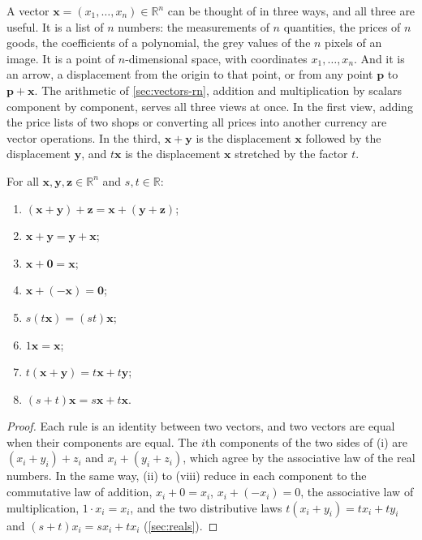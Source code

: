 A vector $\mathbf x=(x_1,\ldots,x_n)\in\mathbb R^n$ can be thought of in three ways, and all three are useful. It is a list of $n$ numbers: the measurements of $n$ quantities, the prices of $n$ goods, the coefficients of a polynomial, the grey values of the $n$ pixels of an image. It is a point of $n$-dimensional space, with coordinates $x_1,\ldots,x_n$. And it is an arrow, a displacement from the origin to that point, or from any point $\mathbf p$ to $\mathbf p+\mathbf x$. The arithmetic of \cref{sec:vectors-rn}, addition and multiplication by scalars component by component, serves all three views at once. In the first view, adding the price lists of two shops or converting all prices into another currency are vector operations. In the third, $\mathbf x+\mathbf y$ is the displacement $\mathbf x$ followed by the displacement $\mathbf y$, and $t\mathbf x$ is the displacement $\mathbf x$ stretched by the factor $t$.

\begin{proposition}
\label{prop:vector-rules}
For all $\mathbf x,\mathbf y,\mathbf z\in\mathbb R^n$ and $s,t\in\mathbb R$:
\begin{enumerate}
\item $(\mathbf x+\mathbf y)+\mathbf z=\mathbf x+(\mathbf y+\mathbf z)$;
\item $\mathbf x+\mathbf y=\mathbf y+\mathbf x$;
\item $\mathbf x+\mathbf 0=\mathbf x$;
\item $\mathbf x+(-\mathbf x)=\mathbf 0$;
\item $s(t\mathbf x)=(st)\mathbf x$;
\item $1\mathbf x=\mathbf x$;
\item $t(\mathbf x+\mathbf y)=t\mathbf x+t\mathbf y$;
\item $(s+t)\mathbf x=s\mathbf x+t\mathbf x$.
\end{enumerate}
\end{proposition}

\begin{proof}
Each rule is an identity between two vectors, and two vectors are equal when their components are equal. The $i$th components of the two sides of (i) are $(x_i+y_i)+z_i$ and $x_i+(y_i+z_i)$, which agree by the associative law of the real numbers. In the same way, (ii) to (viii) reduce in each component to the commutative law of addition, $x_i+0=x_i$, $x_i+(-x_i)=0$, the associative law of multiplication, $1\cdot x_i=x_i$, and the two distributive laws $t(x_i+y_i)=tx_i+ty_i$ and $(s+t)x_i=sx_i+tx_i$ (\cref{sec:reals}).
\end{proof}

